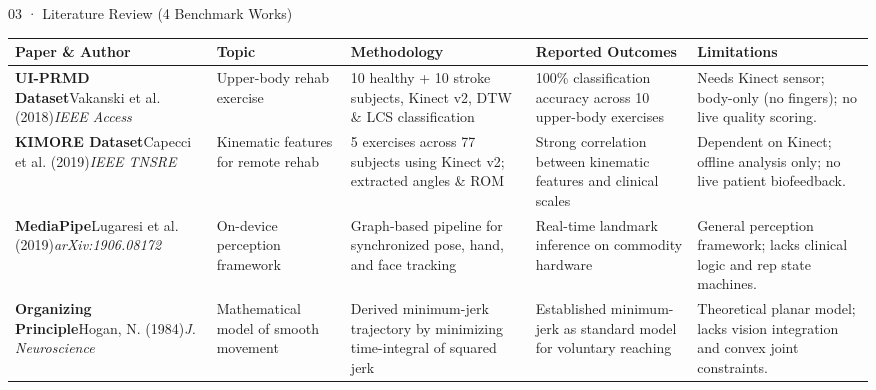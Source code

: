 \documentclass[aspectratio=169,11pt]{beamer}
\begin{document}
\begin{frame}{03 · Literature Review (4 Benchmark Works)}
\vspace{-2mm}
\centering
\setlength{\tabcolsep}{3pt}
\fontsize{7.5pt}{9.2pt}\selectfont
\renewcommand{\arraystretch}{1.08}
\begin{tabular}{p{2.3cm}p{1.9cm}p{3.2cm}p{3.1cm}p{2.5cm}}
\toprule
\textbf{Paper \& Author} & \textbf{Topic} & \textbf{Methodology} & \textbf{Reported Outcomes} & \textbf{Limitations} \\
\midrule
\textbf{UI-PRMD Dataset}\newline Vakanski et al. (2018)\newline \textit{IEEE Access} & 
Upper-body rehab exercise & 
10 healthy + 10 stroke subjects, Kinect v2, DTW \& LCS classification & 
100\% classification accuracy across 10 upper-body exercises & 
Needs Kinect sensor; body-only (no fingers); no live quality scoring. \\
\midrule
\textbf{KIMORE Dataset}\newline Capecci et al. (2019)\newline \textit{IEEE TNSRE} & 
Kinematic features for remote rehab & 
5 exercises across 77 subjects using Kinect v2; extracted angles \& ROM & 
Strong correlation between kinematic features and clinical scales & 
Dependent on Kinect; offline analysis only; no live patient biofeedback. \\
\midrule
\textbf{MediaPipe}\newline Lugaresi et al. (2019)\newline \textit{arXiv:1906.08172} & 
On-device perception framework & 
Graph-based pipeline for synchronized pose, hand, and face tracking & 
Real-time landmark inference on commodity hardware & 
General perception framework; lacks clinical logic and rep state machines. \\
\midrule
\textbf{Organizing Principle}\newline Hogan, N. (1984)\newline \textit{J. Neuroscience} & 
Mathematical model of smooth movement & 
Derived minimum-jerk trajectory by minimizing time-integral of squared jerk & 
Established minimum-jerk as standard model for voluntary reaching & 
Theoretical planar model; lacks vision integration and convex joint constraints. \\
\bottomrule
\end{tabular}
\end{frame}
\end{document}
